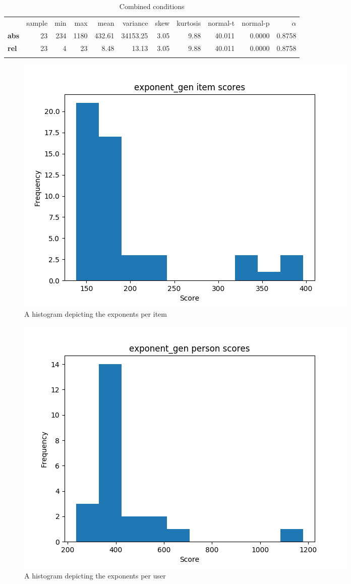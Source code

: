 \begin{longtable}[c]{@{}lrrrrrrrrrr@{}}
    \caption{Combined conditions}
    \endfirsthead
\toprule\addlinespace
& sample & min & max & mean & variance & skew & kurtosis & normal-t &
normal-p & $\alpha$
\\\addlinespace
\midrule\endhead
\textbf{abs} & 23 & 234 & 1180 & 432.61 & 34153.25 & 3.05 & 9.88 &
40.011 & 0.0000 & 0.8758
\\\addlinespace
\textbf{rel} & 23 & 4 & 23 & 8.48 & 13.13 & 3.05 & 9.88 & 40.011 &
0.0000 & 0.8758
\\\addlinespace
\bottomrule
    \label{tab:exponent_gen}
\end{longtable}

\begin{figure}
\includegraphics[width=\textwidth]{img/exponent_gen_diff.png}
    \caption{A histogram depicting the exponents per item}
    \label{fig:exponent_gen_diff}
\end{figure}
\begin{figure}
\includegraphics[width=\textwidth]{img/exponent_gen_abil.png}
    \caption{A histogram depicting the exponents per user}
    \label{fig:exponent_gen_abil}
\end{figure}

